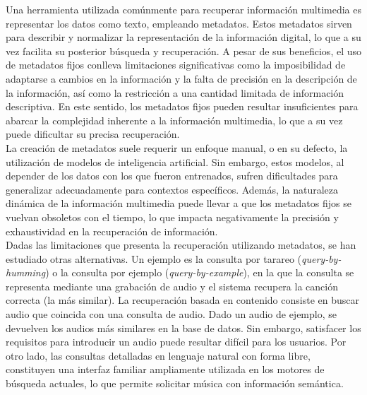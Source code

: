 Una herramienta utilizada comúnmente para recuperar información multimedia es representar los datos como texto, empleando metadatos.%
Estos metadatos sirven para describir y normalizar la representación de la información digital, lo que a su vez facilita su posterior búsqueda y recuperación. A pesar de sus beneficios, el uso de metadatos fijos conlleva limitaciones significativas como la imposibilidad de adaptarse a cambios en la información y la falta de precisión en la descripción de la información, así como la restricción a una cantidad limitada de información descriptiva. En este sentido, los metadatos fijos pueden resultar insuficientes para abarcar la complejidad inherente a la información multimedia, lo que a su vez puede dificultar su precisa recuperación. \\
La creación de metadatos suele requerir un enfoque manual, o en su defecto, la utilización de modelos de inteligencia artificial. Sin embargo, estos modelos, al depender de los datos con los que fueron entrenados, sufren dificultades para generalizar adecuadamente para contextos específicos. Además, la naturaleza dinámica de la información multimedia puede llevar a que los metadatos fijos se vuelvan obsoletos con el tiempo, lo que impacta negativamente la precisión y exhaustividad en la recuperación de información. \\ %

Dadas las limitaciones que presenta la recuperación utilizando metadatos, se han estudiado otras alternativas. Un ejemplo es la consulta por tarareo (\textit{query-by-humming}) o la consulta por ejemplo (\textit{query-by-example}), en la que la consulta se representa mediante una grabación de audio y el sistema recupera la canción correcta (la más similar). La recuperación basada en contenido consiste en buscar audio que coincida con una consulta de audio. Dado un audio de ejemplo, se devuelven los audios más similares en la base de datos. Sin embargo, satisfacer los requisitos para introducir un audio puede resultar difícil para los usuarios. Por otro lado, las consultas detalladas en lenguaje natural con forma libre, constituyen una interfaz familiar ampliamente utilizada en los motores de búsqueda actuales, lo que permite solicitar música con información semántica.\\

